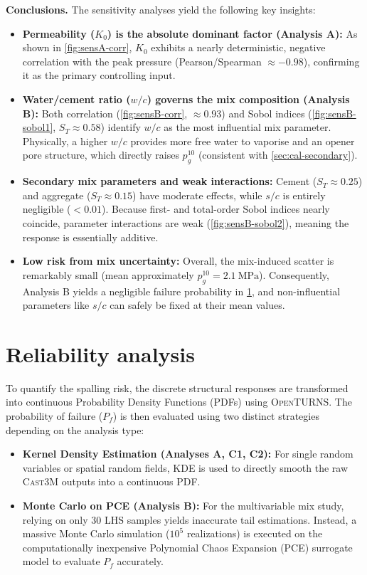 \textbf{Conclusions.} The sensitivity analyses yield the following key insights:
\begin{itemize}
    \item \textbf{Permeability ($K_0$) is the absolute dominant factor (Analysis A):} As shown in \cref{fig:sensA-corr}, $K_0$ exhibits a nearly deterministic, negative correlation with the peak pressure (Pearson/Spearman $\approx -0.98$), confirming it as the primary controlling input.
    \item \textbf{Water/cement ratio ($w/c$) governs the mix composition (Analysis B):} Both correlation (\cref{fig:sensB-corr}, $\approx 0.93$) and Sobol indices (\cref{fig:sensB-sobol1}, $S_{T} \approx 0.58$) identify $w/c$ as the most influential mix parameter. Physically, a higher $w/c$ provides more free water to vaporise and an opener pore structure, which directly raises $p_g^{10}$ (consistent with \cref{sec:cal-secondary}).
    \item \textbf{Secondary mix parameters and weak interactions:} Cement ($S_{T} \approx 0.25$) and aggregate ($S_{T} \approx 0.15$) have moderate effects, while $s/c$ is entirely negligible ($<0.01$). Because first- and total-order Sobol indices nearly coincide, parameter interactions are weak (\cref{fig:sensB-sobol2}), meaning the response is essentially additive.
    \item \textbf{Low risk from mix uncertainty:} Overall, the mix-induced scatter is remarkably small (mean approximately $p_g^{10}=2.1~\mathrm{MPa}$). Consequently, Analysis B yields a negligible failure probability in \cref{sec:reliability}, and non-influential parameters like $s/c$ can safely be fixed at their mean values.
\end{itemize}

 
\section{Reliability analysis} \label{sec:reliability}

To quantify the spalling risk, the discrete structural responses are transformed into continuous Probability Density Functions (PDFs) using \textsc{OpenTURNS}. The probability of failure ($P_f$) is then evaluated using two distinct strategies depending on the analysis type:

\begin{itemize}
    \item \textbf{Kernel Density Estimation (Analyses A, C1, C2):} For single random variables or spatial random fields, KDE is used to directly smooth the raw \textsc{Cast3M} outputs into a continuous PDF. 
    \item \textbf{Monte Carlo on PCE (Analysis B):} For the multivariable mix study, relying on only 30 LHS samples yields inaccurate tail estimations. Instead, a massive Monte Carlo simulation ($10^5$ realizations) is executed on the computationally inexpensive Polynomial Chaos Expansion (PCE) surrogate model to evaluate $P_f$ accurately.
\end{itemize}

